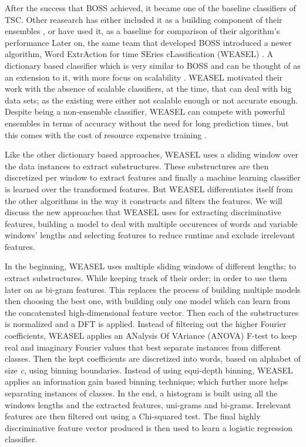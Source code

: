 After the success that BOSS achieved, it became one of the baseline classifiers of TSC.
Other reasearch has either included it as a building component of their ensembles \cite{lines2018time, bagnall2015time},
or have used it, as a baseline for comparison of their algorithm's performance \cite{fawaz2020inceptiontime,shifaz2020ts,lucas2019proximity}
Later on, the same team that developed BOSS introduced a newer algorithm, Word ExtrAction for time SEries cLassification (WEASEL) \cite{schafer2017fast}.
A dictionary based classifier which is very similar to BOSS and can be thought of as an extension to it, with more focus on scalability \cite{middlehurst2019scalable}.
WEASEL motivated their work with the absence of scalable classifiers, at the time, that can deal with big data sets; as the existing were either not scalable enough
or not accurate enough. Despite being a non-ensemble classifier, WEASEL can compete with powerful ensembles in terms of accuracy without the need for
long prediction times, but this comes with the cost of resource expensive training \cite{middlehurst2019scalable}.

Like the other dictionary based approaches, WEASEL uses a sliding window over the data instances to extract substructures.
These substructures are then discretized per window to extract features and finally a machine learning classifier is learned over the transformed features.
But WEASEL differentiates itself from the other algorithms in the way it constructs and filters the features.
We will discuss the new approaches that WEASEL uses for extracting discriminative features, building a model to deal with multiple occurences of words and variable windows' lengths
and selecting features to reduce runtime and exclude irrelevant features.

In the beginning, WEASEL uses multiple sliding windows of different lengths; to extract substructures.
While keeping track of their order; in order to use them later on as bi-gram features.
This replaces the process of building multiple models then choosing the best one, with building only one model which can learn from the concatenated high-dimensional feature vector.
Then each of the substructures is normalized and a DFT is applied.
Instead of filtering out the higher Fourier coefficients, WEASEL applies an ANalysis Of VAriance (ANOVA) F-test to keep real and imaginary Fourier values that best separate instances from different classes.
Then the kept coefficients are discretized into words, based on alphabet of size \emph{c}, using binning boundaries. Instead of using equi-depth binning, WEASEL applies an information gain based
binning technique; which further more helps separating instances of classes.
In the end, a histogram is built using all the windows lengths and the extracted features, uni-grams and bi-grams.
Irrelevant features are then filtered out using a Chi-squared test. The final highly discriminative feature vector produced is then used to learn a logistic regression classifier.

